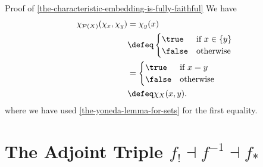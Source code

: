 \begin{Proof}{Proof of \cref{the-characteristic-embedding-is-fully-faithful}}%
    We have
    \begin{align*}
        \chi_{\mathcal{P}(X)}(\chi_{x},\chi_{y}) &=      \chi_{y}(x)\\
                                                 &\defeq \begin{cases}
                                                             \true  &\text{if $x\in\{y\}$}\\
                                                             \false &\text{otherwise}
                                                         \end{cases}\\
                                                 &=      \begin{cases}
                                                             \true  &\text{if $x=y$}\\
                                                             \false &\text{otherwise}
                                                         \end{cases}\\
                                                 &\defeq \chi_{X}(x,y).
    \end{align*}
    where we have used \cref{the-yoneda-lemma-for-sets} for the first equality.
\end{Proof}
\section{The Adjoint Triple $f_{!}\dashv f^{-1}\dashv f_{*}$}\label{subsection-the-adjoint-triple-f-star-f-minus-one-f-shriek}

